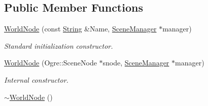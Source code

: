 \subsection*{Public Member Functions}
\begin{DoxyCompactItemize}
\item 
\hyperlink{classphys_1_1WorldNode_a02ab92f8a5f9da35926ef133a11a441e}{WorldNode} (const \hyperlink{namespacephys_aa03900411993de7fbfec4789bc1d392e}{String} \&Name, \hyperlink{classphys_1_1SceneManager}{SceneManager} $\ast$manager)
\begin{DoxyCompactList}\small\item\em Standard initialization constructor. \item\end{DoxyCompactList}\item 
\hyperlink{classphys_1_1WorldNode_ae813a2aa737980824725b1909372484e}{WorldNode} (Ogre::SceneNode $\ast$snode, \hyperlink{classphys_1_1SceneManager}{SceneManager} $\ast$manager)
\begin{DoxyCompactList}\small\item\em Internal constructor. \item\end{DoxyCompactList}\item 
\hypertarget{classphys_1_1WorldNode_a357c18b6e04a9ae0d0855841a3c774b2}{
\hyperlink{classphys_1_1WorldNode_a357c18b6e04a9ae0d0855841a3c774b2}{$\sim$WorldNode} ()}
\label{d2/d3e/classphys_1_1WorldNode_a357c18b6e04a9ae0d0855841a3c774b2}


\end{DoxyCompactItemize}
